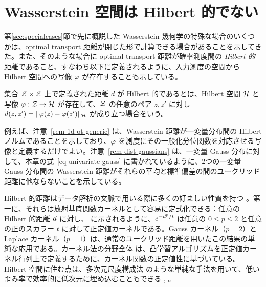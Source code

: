 \section{Wasserstein 空間は Hilbert 的でない}\label{sec-non-embeddability}

第\ref{sec:specialcases}節で先に概説した Wasserstein 幾何学の特殊な場合のいくつかは、optimal transport 距離が閉じた形で計算できる場合があることを示してきた。また、そのような場合に optimal transport 距離が確率測度間の \emph{Hilbert 的}距離であること、すなわち以下に定義されるように、入力測度の空間から Hilbert 空間への写像 $\tphi$ が存在することも示している。

\begin{defn}\label{def-Hilbertmetric}
集合 $\mathcal{Z}\times \mathcal{Z}$ 上で定義された距離 $d$ が Hilbert 的であるとは、Hilbert 空間 $\mathcal{H}$ と写像 $\tphi:\Z\rightarrow \RKHS$ が存在して、$\mathcal{Z}$ の任意のペア $z,z'$ に対し $d(z,z')=\|\tphi(z)-\tphi(z')\|_\RKHS$ が成り立つ場合をいう。
\end{defn}

例えば、注意~\ref{rem-1d-ot-generic} は、Wasserstein 距離が一変量分布間の Hilbert ノルムであることを示しており、$\tphi$ を測度にその一般化分位関数を対応させる写像と定義するだけでよい。注意~\ref{rem-dist-gaussians} は、一変量 Gauss 分布に対して、本章の式~\eqref{eq-univariate-gauss} に書かれているように、2つの一変量 Gauss 分布間の Wasserstein 距離がそれらの平均と標準偏差の間のユークリッド距離に他ならないことを示している。

Hilbert 的距離はデータ解析の文脈で用いる際に多くの好ましい性質を持つ \citep{dattorro2010convex}。第一に、それらは放射基底関数カーネルとして容易に定式化できる：任意の Hilbert 的距離 $d$ に対し、\citep[Cor. 3.3.3, Prop. 3.2.7]{berg84harmonic} に示されるように、$e^{-d^p/t}$ は任意の $0\leq p\leq 2$ と任意の正のスカラー $t$ に対して正定値カーネルである。Gauss カーネル（$p=2$）と Laplace カーネル（$p=1$）は、通常のユークリッド距離を用いたこの結果の単純な応用である。カーネル法の分野全体 \citep{Hofmann2008} は、凸学習アルゴリズムを正定値カーネル行列上で定義するために、カーネル関数の正定値性に基づいている。Hilbert 空間に住む点は、多次元尺度構成法 \citep{borg2005modern} のような単純な手法を用いて、低い歪み率で効率的に低次元に埋め込むこともできる \citep{Johnson84}, \citep[\S V.6.2]{barvinok2002course}。

